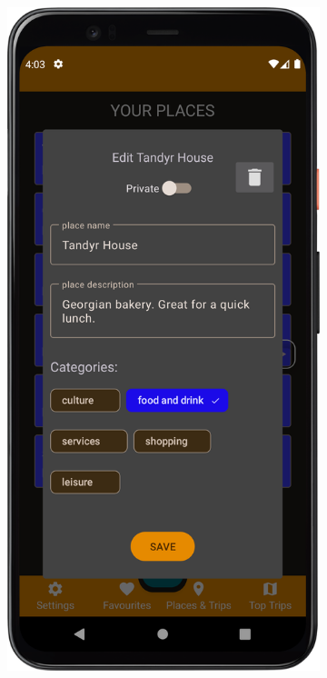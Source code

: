         \begin{figure}[H]
            \centering
            \begin{subfigure}[b]{0.3\textwidth}
                \centering
                \includegraphics[width=\textwidth]{src/app/edit_place.png}

\end{subfigure}
\end{figure}
